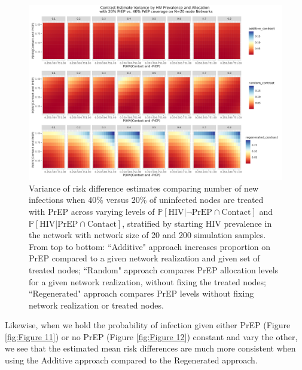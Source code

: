 \documentclass{article}
\theoremstyle{definition}
\begin{document}
\begin{figure}[H]
    \centering
    \includegraphics[width=\linewidth]{Corrected Figures/HIV Prevalence Variance Plot.png}
    \caption{Variance of risk difference estimates comparing number of new infections when 40\% versus 20\% of uninfected nodes are treated with PrEP across varying levels of $\mathbb{P}\left[\text{HIV} \vert \neg \text{PrEP} \cap \text{Contact}\right]$ and $\mathbb{P}\left[\text{HIV} \vert \text{PrEP} \cap \text{Contact}\right]$, stratified by starting HIV prevalence in the network with network size of 20 and 200 simulation samples.
    From top to bottom: ``Additive" approach increases proportion on PrEP compared to a given network realization and given set of treated nodes; ``Random" approach compares PrEP allocation levels for a given network realization, without fixing the treated nodes; ``Regenerated" approach compares PrEP levels without fixing network realization or treated nodes.}
    \label{fig:Figure 10}
\end{figure}


Likewise, when we hold the probability of infection given either PrEP (Figure \ref{fig:Figure 11}) or no PrEP (Figure \ref{fig:Figure 12}) constant and vary the other, we see that the estimated mean risk differences are much more consistent when using the Additive approach compared to the Regenerated approach. 
\end{document}
